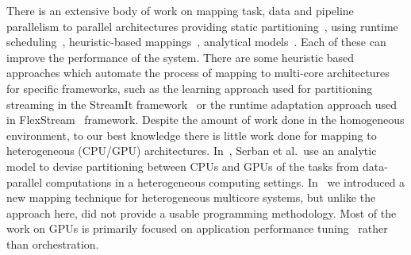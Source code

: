\documentclass[smallextended]{svjour3}
\begin{document}
There is an extensive body
of work on mapping task, data and pipeline parallelism to
parallel architectures providing static
partitioning~\cite{kwok1999static,saraswat2007x10,subhlok1993exploiting}, using runtime scheduling~\cite{distributed1984dynamic}, heuristic-based
mappings~\cite{gordon2006exploiting}, analytical models~\cite{navarro2009analytical}. Each of these can improve the performance of the system.
There are some heuristic based approaches which automate the process of mapping to multi-core architectures for specific frameworks, such as 
the learning approach used for partitioning streaming in the StreamIt framework~\cite{wang2010partitioning} or the runtime adaptation 
approach used in FlexStream~\cite{hormati2009flextream} framework.
Despite the amount of work done in the homogeneous environment, to our best knowledge there is little work done for mapping to 
heterogeneous (CPU/GPU) architectures. In~\cite{danelutto2013}, Serban et al.~use an analytic model to devise partitioning between CPUs and GPUs of the tasks from data-parallel computations in a heterogeneous computing settings. 
In~\cite{cec} we introduced a new mapping technique for heterogeneous multicore systems, 
but unlike the approach here, did not provide a usable programming methodology.
%
Most of the work on GPUs is primarily focused on application performance 
tuning~\cite{agrawal2005optimizing} rather than orchestration.
%
\end{document}
